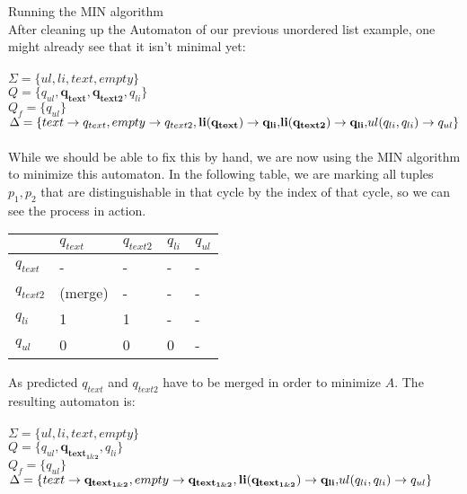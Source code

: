\documentclass{llncs}
\begin{document}
\begin{example}{Running the MIN algorithm}\\
After cleaning up the Automaton of our previous unordered list example, one might already see that it isn't minimal yet:\\\\
				\automatonDefinition
				\(\Sigma = \{ul, li, text, empty\}\)
				\\
				\(Q = \{q_{ul}, \mathbf{q_{text}, q_{text2}}, q_{li}\}\)
				\\
				\(Q_f = \{ q_{ul} \}\)
				\\
				\(\Delta = \{		text \rightarrow q_{text},
				\\
				empty \rightarrow q_{text2},
				\\
				\mathbf{
					li(q_{text}) \rightarrow q_{li},	
				}	
				\\
				\mathbf {
					li(q_{text2}) \rightarrow q_{li},
				}
				\\
				ul(q_{li}, q_{li}) \rightarrow q_{ul}
				\}\)
				\\
				\\
While we should be able to fix this by hand, we are now using the MIN algorithm to minimize this automaton. In the following table, we are marking all tuples \(p_1, p_2\) that are distinguishable in that cycle by the index of that cycle, so we can see the process in action.
\begin{center}
	\begin{tabular}{| l |  l | l | l |  l  |}
		\hline
		&	 \(q_{text}\) 	& 	\(q_{text2}\) 	& 	\(q_{li}\)  	& 	\(q_{ul}\) 	\\ \hline
		\(q_{text}\) 	&	-			&	-			&	-		&	-		\\ \hline
		\(q_{text2}\) 	&	(merge)	&	-		&	-		&	-		\\ \hline
		\(q_{li}\) 		&	1			&	1			&	-		&	-		\\ \hline
		\(q_{ul}\) 		&	0			&	0			&	0		&	-		\\
		\hline
	\end{tabular}
\end{center}

\pagebreak

As predicted \(q_{text}\) and \(q_{text2}\) have to be merged in order to minimize \(A\). The resulting automaton is:
\\
\\
\automatonDefinition
\(\Sigma = \{ul, li, text, empty\}\)
\\
\(Q = \{q_{ul}, \mathbf{q_{text_{1\&2}}}, q_{li}\}\)
\\
\(Q_f = \{ q_{ul} \}\)
\\
\(\Delta = \{		text \rightarrow \mathbf{q_{text_{1\&2}}},
\\
empty \rightarrow \mathbf{q_{text_{1\&2}}},
\\
\mathbf{
	li(q_{text_{1\&2}}) \rightarrow q_{li},	
}
\\
ul(q_{li}, q_{li}) \rightarrow q_{ul}
\}\)
\\
\\
\end{example}
\end{document}
